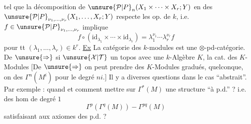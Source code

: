 tel que la décomposition de $\unsure{\mathcal P|P}_n(X_1\times\cdots\times X_r;Y)$ en des $\unsure{\mathcal P|P}_{\nu_1,\ldots,\nu_r}(X_1,\ldots,X_r;Y)$ respecte les op. de $k$, i.e. $f\in \unsure{\mathcal P|P}_{\nu_1,\ldots,\nu_r}$ implique
\[f\circ(\mathrm{id}_{\lambda_1}\times\cdots\times\mathrm{id}_{\lambda_r})=\lambda_1^{\nu_1}\cdots\lambda_r^{\nu_r}f\]
pour tt $(\lambda_1,\ldots,\lambda_r)\in k^r$.
\uline{Ex} La catégorie des $k$-modules est une $\otimes$-pd-catégorie.
De $\unsure{\Rightarrow}$ si $\unsure{\mathcal X|\mathcal T}$ un topos avec une $k$-Algèbre $K$, la cat. des $K$-Modules
 [De $\unsure{\Rightarrow}$ on peut prendre des $K$-Modules gradués,  quelconque,  on  des  $\Gamma^n(M^i)$ pour le degré $ni$.]
Il y a diverses questions dans le cas ``abstrait''. Par exemple : quand et comment mettre sur $\Gamma^*(M)$  une structure ``à p.d.'' ? i.e. des hom de degré $1$
\[\Gamma^p(\Gamma^q(M))\mathbin{-}\Gamma^{pq}(M)\]
satisfaisant aux axiomes des p.d. ?

